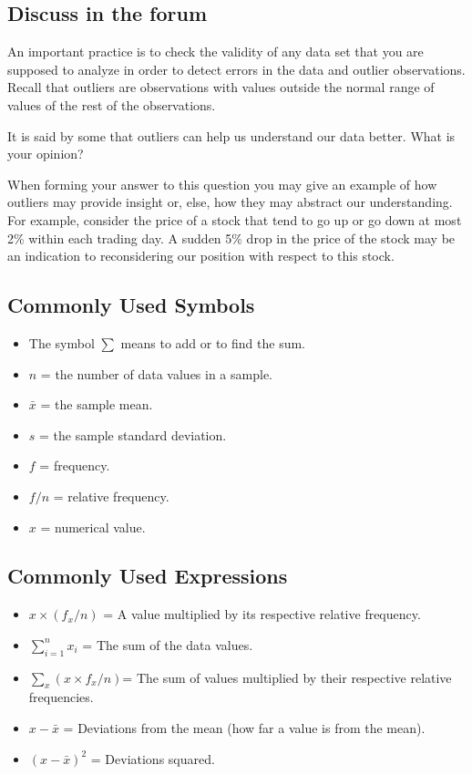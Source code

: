\documentclass[]{krantz}
\theoremstyle{definition}
\theoremstyle{definition}
\theoremstyle{definition}
\theoremstyle{remark}
\begin{document}
\hypertarget{discuss-in-the-forum}{%
\subsection*{Discuss in the forum}\label{discuss-in-the-forum}}


An important practice is to check the validity of any data set that you
are supposed to analyze in order to detect errors in the data and
outlier observations. Recall that outliers are observations with values
outside the normal range of values of the rest of the observations.

It is said by some that outliers can help us understand our data better.
What is your opinion?

When forming your answer to this question you may give an example of how
outliers may provide insight or, else, how they may abstract our
understanding. For example, consider the price of a stock that tend to
go up or go down at most 2\% within each trading day. A sudden 5\% drop in
the price of the stock may be an indication to reconsidering our
position with respect to this stock.

\hypertarget{commonly-used-symbols}{%
\subsection*{Commonly Used Symbols}\label{commonly-used-symbols}}


\begin{itemize}
\item
  The symbol \(\sum\) means to add or to find the sum.
\item
  \(n\) = the number of data values in a sample.
\item
  \(\bar x\) = the sample mean.
\item
  \(s\) = the sample standard deviation.
\item
  \(f\) = frequency.
\item
  \(f/n\) = relative frequency.
\item
  \(x\) = numerical value.
\end{itemize}

\hypertarget{commonly-used-expressions}{%
\subsection*{Commonly Used Expressions}\label{commonly-used-expressions}}


\begin{itemize}
\item
  \(x \times (f_x/n)\) = A value multiplied by its respective relative
  frequency.
\item
  \(\sum_{i=1}^n x_i\) = The sum of the data values.
\item
  \(\sum_x (x \times f_x/n)\)= The sum of values multiplied by their
  respective relative frequencies.
\item
  \(x - \bar x\) = Deviations from the mean (how far a value is from the
  mean).
\item
  \((x - \bar x)^2\) = Deviations squared.
\end{itemize}
\end{document}
